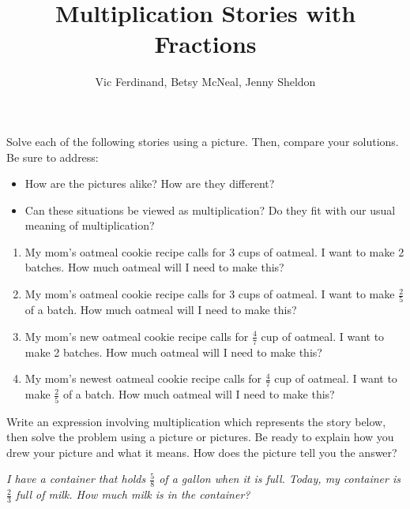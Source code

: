 \documentclass{ximera}
\title{Multiplication Stories with Fractions}
\author{Vic Ferdinand, Betsy McNeal, Jenny Sheldon}
\begin{document}
\begin{abstract} \end{abstract}
\maketitle




\begin{problem}
 Solve each of the following stories using a picture.  Then, compare your solutions.  Be sure to address:   
\begin{itemize}
    \item How are the pictures alike?  How are they different?
    \item Can these situations be viewed as multiplication?  Do they fit with our usual meaning of multiplication?
\end{itemize}

\begin{enumerate}%
    \item My mom's oatmeal cookie recipe calls for 3 cups of oatmeal.  
I want to make 2 batches.
How much oatmeal will I need to make this?
    \item My mom's oatmeal cookie recipe calls for 3 cups of oatmeal.  
I want to make $\frac{2}{5}$ of a batch.
How much oatmeal will I need to make this?
    \item My mom's new oatmeal cookie recipe calls for $\frac{4}{7}$ cup of oatmeal.  
I want to make 2 batches.
How much oatmeal will I need to make this?
    \item My mom's newest oatmeal cookie recipe calls for  $\frac{4}{7}$ cup of oatmeal.  
I want to make $\frac{2}{5}$ of a batch.
How much oatmeal will I need to make this?
\end{enumerate}

\end{problem}

\newpage




\begin{problem}
 Write an expression involving multiplication which represents the story below, then solve the problem using a picture or pictures.  Be ready to explain how you drew your picture and what it means.  How does the picture tell you the answer?

\emph{I have a container that holds $\frac{5}{8}$ of a gallon when it is full.  Today, my container is $\frac{2}{3}$ full of milk. How much milk is in the container?}
\end{problem}
\vfill
\end{document}
